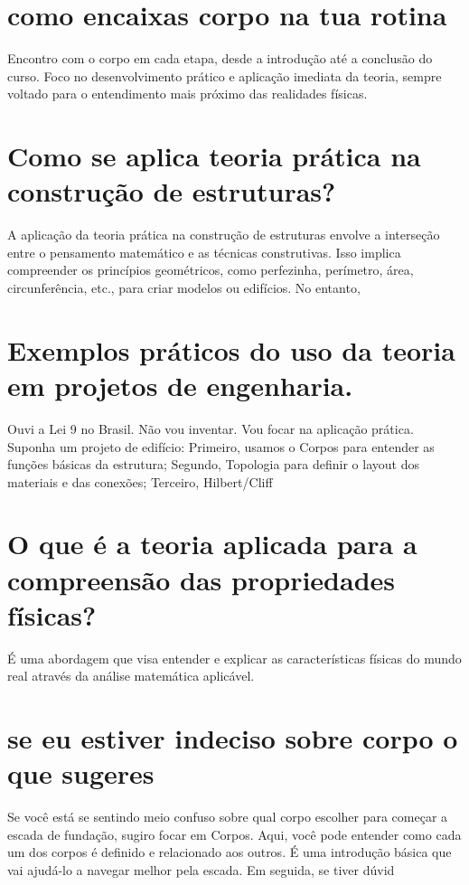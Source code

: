\documentclass[11pt,a4paper]{article}
\begin{document}
\maketitle
\begin{abstract}Exploração do ollama a partir de sementes banais (nível 2). Teoria continua de fora.\end{abstract}
\section{como encaixas corpo na tua rotina}
Encontro com o corpo em cada etapa, desde a introdução até a conclusão do curso. Foco no desenvolvimento prático e aplicação imediata da teoria, sempre voltado para o entendimento mais próximo das realidades físicas.

\section{Como se aplica teoria prática na construção de estruturas?}
A aplicação da teoria prática na construção de estruturas envolve a interseção entre o pensamento matemático e as técnicas construtivas. Isso implica compreender os princípios geométricos, como perfezinha, perímetro, área, circunferência, etc., para criar modelos ou edifícios. No entanto,

\section{Exemplos práticos do uso da teoria em projetos de engenharia.}
Ouvi a Lei 9 no Brasil. Não vou inventar. Vou focar na aplicação prática. Suponha um projeto de edifício: Primeiro, usamos o Corpos para entender as funções básicas da estrutura; Segundo, Topologia para definir o layout dos materiais e das conexões; Terceiro, Hilbert/Cliff

\section{O que é a teoria aplicada para a compreensão das propriedades físicas?}
É uma abordagem que visa entender e explicar as características físicas do mundo real através da análise matemática aplicável.

\section{se eu estiver indeciso sobre corpo o que sugeres}
Se você está se sentindo meio confuso sobre qual corpo escolher para começar a escada de fundação, sugiro focar em Corpos. Aqui, você pode entender como cada um dos corpos é definido e relacionado aos outros. É uma introdução básica que vai ajudá-lo a navegar melhor pela escada. Em seguida, se tiver dúvid
\end{document}
